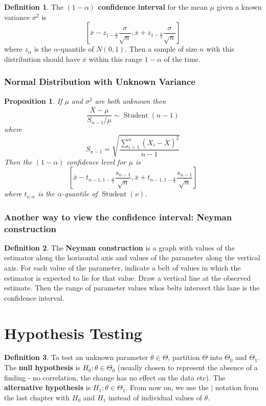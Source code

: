 \documentclass[12pt]{article}
\newtheorem*{prop*}{Proposition}
\theoremstyle{definition}
\newtheorem*{defn*}{Definition}
\DeclareMathOperator{\Student}{Student}
\begin{document}
\begin{defn*}
  The \textbf{$(1 - \alpha)$ confidence interval} for the mean $\mu$ given a known variance $\sigma^2$ is
  $$\left[\overline{x} - z_{1 - \frac{\alpha}{2}}\frac{\sigma}{\sqrt{n}}, \overline{x} + z_{1 - \frac{\alpha}{2}}\frac{\sigma}{\sqrt{n}}\right]$$
  where $z_\alpha$ is the $\alpha$-quantile of $N(0, 1)$.
  Then a sample of size $n$ with this distribution should have $\overline{x}$ within this range $1 - \alpha$ of the time.
\end{defn*}

\subsubsection{Normal Distribution with Unknown Variance}

\begin{prop*}
  If $\mu$ and $\sigma^2$ are both unknown then 
  $$\frac{\overline{X} - \mu}{S_{n - 1} / \mu} \sim \Student(n - 1)$$
  where
  $$S_{n - 1} = \sqrt{\frac{\sum_{i = 1}^n(X_i - \overline{X})^2}{n - 1}}$$
  Then the $(1 - \alpha)$ confidence level for $\mu$ is
  $$\left[\overline{x} - t_{n - 1, 1 - \frac{\alpha}{2}}\frac{s_{n - 1}}{\sqrt{n}}, \overline{x} + t_{n - 1, 1 - \frac{\alpha}{2}}\frac{s_{n - 1}}{\sqrt{n}}\right]$$
  where $t_{\nu, \alpha}$ is the $\alpha$-quantile of $\Student(\nu)$.
\end{prop*}

\subsubsection{Another way to view the confidence interval: Neyman construction}

\begin{defn*}
  The \textbf{Neyman construction} is a graph with values of the estimator along the horizontal axis and values of the parameter along the vertical axis.
  For each value of the parameter, indicate a belt of values in which the estimator is expected to lie for that value.
  Draw a vertical line at the observed estimate.
  Then the range of parameter values whos belts intersect this lane is the confidence interval.
\end{defn*}

\section{Hypothesis Testing}

\begin{defn*}
  To test an unknown parameter $\theta \in \Theta$, partition $\Theta$ into $\Theta_0$ and $\Theta_1$.
  The \textbf{null hypothesis} is $H_0 : \theta \in \Theta_0$ (usually chosen to represent the absence of a finding - no correlation, the change has no effect on the data etc).
  The \textbf{alternative hypothesis} is $H_1 : \theta \in \Theta_1$.
  From now on, we use the $\mid$ notation from the last chapter with $H_0$ and $H_1$ instead of individual values of $\theta$.
\end{defn*}
\end{document}
